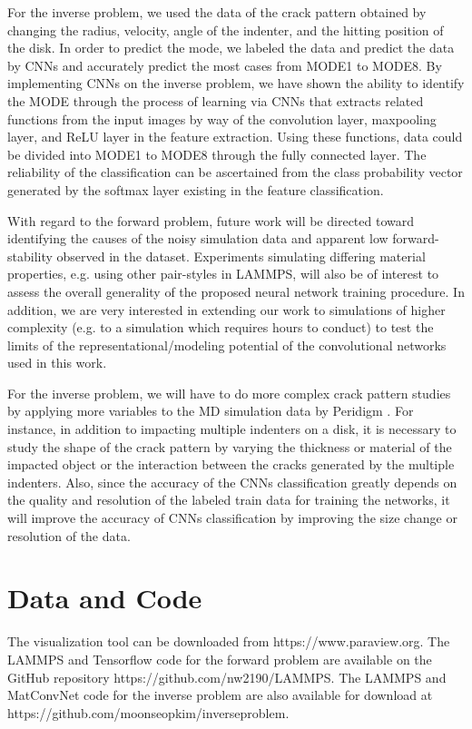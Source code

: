 For the inverse problem, we used the data of the crack pattern obtained by changing the radius, velocity, angle of the indenter, and the hitting position of the disk. In order to predict the mode, we labeled the data and predict the data by CNNs and accurately predict the most cases from MODE1 to MODE8. By implementing CNNs on the inverse problem, we have shown the ability to identify the MODE through the process of learning via CNNs that extracts related functions from the input images by way of the convolution layer, maxpooling layer, and ReLU layer in the feature extraction. Using these functions, data could be divided into MODE1 to MODE8 through the fully connected layer. The reliability of the classification can be ascertained from the class probability vector generated by the softmax layer existing in the feature classification. 

With regard to the forward problem, future work will be directed toward identifying the causes of the noisy simulation data and apparent low forward-stability observed in the dataset.  Experiments simulating differing material properties, e.g. using other pair-styles in LAMMPS, will also be of interest to assess the overall generality of the proposed neural network training procedure.  In addition, we are very interested in extending our work to simulations of higher complexity (e.g. to a simulation which requires hours to conduct) to test the limits of the representational/modeling potential of the convolutional networks used in this work.

For the inverse problem, we will have to do more complex crack pattern studies by applying more variables to the MD simulation data by Peridigm \cite{Ref30}. For instance, in addition to impacting multiple indenters on a disk, it is necessary to study the shape of the crack pattern by varying the thickness or material of the impacted object or the interaction between the cracks generated by the multiple indenters. Also, since the accuracy of the CNNs classification greatly depends on the quality and resolution of the labeled train data for training the networks, it will improve the accuracy of CNNs classification by improving the size change or resolution of the data. 


\section{Data and Code}
\label{sec:6}
The visualization tool can be downloaded from https://www.paraview.org.
The LAMMPS and Tensorflow code for the forward problem are available on the GitHub repository  https://github.com/nw2190/LAMMPS.
The LAMMPS and MatConvNet code for the inverse problem are also available for download at  https://github.com/moonseopkim/inverseproblem.


